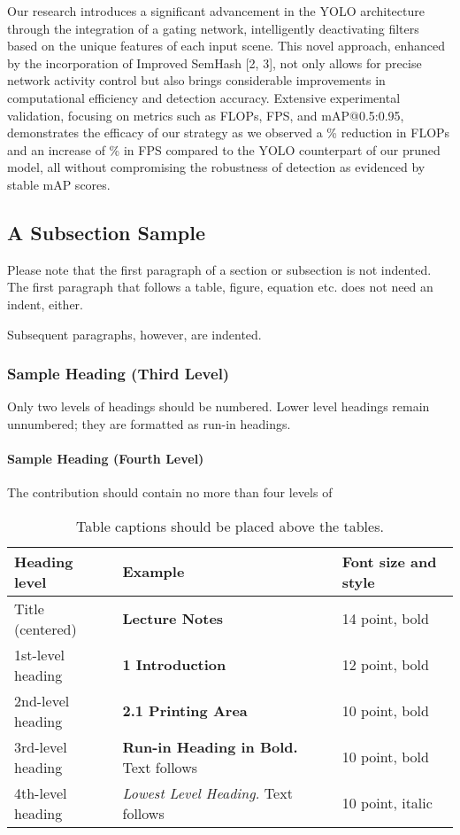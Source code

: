 \documentclass[runningheads]{llncs}
\begin{document}
Our research introduces a significant advancement in the YOLO architecture through the integration of a gating network, intelligently deactivating filters based on the unique features of each input scene. This novel approach, enhanced by the incorporation of Improved SemHash [2, 3], not only allows for precise network activity control but also brings considerable improvements in computational efficiency and detection accuracy. Extensive experimental validation, focusing on metrics such as FLOPs, FPS, and mAP@0.5:0.95, demonstrates the efficacy of our strategy as we observed a \% reduction in FLOPs and an increase of \% in FPS compared to the YOLO counterpart of our pruned model, all without compromising the robustness of detection as evidenced by stable mAP scores.

\subsection{A Subsection Sample}
Please note that the first paragraph of a section or subsection is
not indented. The first paragraph that follows a table, figure,
equation etc. does not need an indent, either.

Subsequent paragraphs, however, are indented.

\subsubsection{Sample Heading (Third Level)} Only two levels of
headings should be numbered. Lower level headings remain unnumbered;
they are formatted as run-in headings.

\paragraph{Sample Heading (Fourth Level)}
The contribution should contain no more than four levels of

\begin{table}
\caption{Table captions should be placed above the
tables.}\label{tab1}
\begin{tabular}{|l|l|l|}
\hline
Heading level &  Example & Font size and style\\
\hline
Title (centered) &  {\Large\bfseries Lecture Notes} & 14 point, bold\\
1st-level heading &  {\large\bfseries 1 Introduction} & 12 point, bold\\
2nd-level heading & {\bfseries 2.1 Printing Area} & 10 point, bold\\
3rd-level heading & {\bfseries Run-in Heading in Bold.} Text follows & 10 point, bold\\
4th-level heading & {\itshape Lowest Level Heading.} Text follows & 10 point, italic\\
\hline
\end{tabular}
\end{table}
\end{document}
